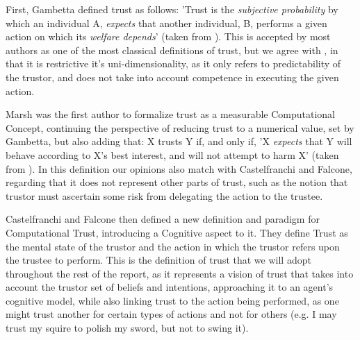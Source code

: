 \begin{itemize}
	\tallitem First, Gambetta\cite{Gambetta1988} defined trust as follows: 'Trust is the \textit{subjective probability} by which an individual A, \textit{expects} that another individual, B, performs a given action on which its \textit{welfare depends}' (taken from \cite{Castelfranchi2010}). This is accepted by most authors as one of the most classical definitions of trust, but we agree with \cite{Castelfranchi2010}, in that it is restrictive it's uni-dimensionality, as it only refers to predictability of the trustor, and does not take into account competence in executing the given action.
	
	\tallitem Marsh\cite{Marsh1994} was the first author to formalize trust as a measurable Computational Concept, continuing the perspective of reducing trust to a numerical value, set by Gambetta\cite{Gambetta1988}, but also adding that: X trusts Y if, and only if, 'X \textit{expects} that Y will behave according to X's best interest, and will not attempt to harm X' (taken from \cite{Castelfranchi2010}). In this definition our opinions also match with Castelfranchi and Falcone, regarding that it does not represent other parts of trust, such as the notion that trustor must ascertain some risk from delegating the action to the trustee.
	
	\tallitem Castelfranchi and Falcone then defined a new definition and paradigm for Computational Trust, introducing a Cognitive aspect to it\cite{Castelfranchi1998}. They define Trust as the mental state of the trustor and the action in which the trustor refers upon the trustee to perform. This is the definition of trust that we will adopt throughout the rest of the report, as it represents a vision of trust that takes into account the trustor set of beliefs and intentions, approaching it to an agent's cognitive model, while also linking trust to the action being performed, as one might trust another for certain types of actions and not for others (e.g. I may trust my squire to polish my sword, but not to swing it).
\end{itemize}

